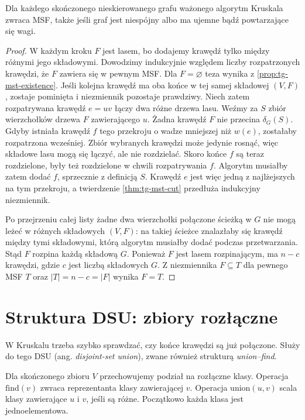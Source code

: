 \begin{twierdzenie}
\label{thm:tg-mst-kruskal}
Dla każdego skończonego nieskierowanego
grafu ważonego algorytm Kruskala zwraca MSF,
także jeśli graf jest niespójny albo
ma ujemne bądź powtarzające się wagi.
\end{twierdzenie}
\begin{proof}
W każdym kroku $F$ jest lasem, bo dodajemy
krawędź tylko między różnymi jego składowymi.
Dowodzimy indukcyjnie względem liczby rozpatrzonych
krawędzi, że $F$ zawiera się w pewnym MSF.
Dla $F=\varnothing$ teza wynika z
\ref{prop:tg-mst-existence}.
Jeśli kolejna krawędź ma oba końce w tej samej
składowej $(V,F)$, zostaje pominięta i niezmiennik
pozostaje prawdziwy. Niech zatem rozpatrywana
krawędź $e=uv$ łączy dwa różne drzewa lasu.
Weźmy za $S$ zbiór wierzchołków
drzewa $F$ zawierającego $u$.
Żadna krawędź $F$ nie przecina
$\delta_G(S)$. Gdyby istniała
krawędź $f$ tego przekroju
o wadze mniejszej niż $w(e)$,
zostałaby rozpatrzona wcześniej.
Zbiór wybranych krawędzi może jedynie rosnąć,
więc składowe lasu mogą się łączyć, ale nie rozdzielać.
Skoro końce $f$ są teraz rozdzielone, były też
rozdzielone w chwili rozpatrywania $f$.
Algorytm musiałby zatem dodać $f$,
sprzecznie z definicją $S$.
Krawędź $e$ jest więc
jedną z najlżejszych na tym
przekroju, a twierdzenie
\ref{thm:tg-mst-cut} przedłuża
indukcyjny niezmiennik.

Po przejrzeniu całej listy
żadne dwa wierzchołki połączone
ścieżką w $G$ nie mogą leżeć
w różnych składowych $(V,F)$:
na takiej ścieżce znalazłaby
się krawędź między tymi
składowymi, którą algorytm
musiałby dodać podczas
przetwarzania. Stąd $F$
rozpina każdą składową $G$.
Ponieważ $F$ jest lasem rozpinającym, ma $n-c$
krawędzi, gdzie $c$ jest liczbą składowych $G$.
Z niezmiennika $F\subseteq T$ dla pewnego MSF $T$
oraz $|T|=n-c=|F|$ wynika $F=T$.
\end{proof}

\section{Struktura DSU: zbiory rozłączne}
\label{sec:tg-mst-dsu}

W Kruskalu trzeba szybko sprawdzać,
czy końce krawędzi są już połączone.
Służy do tego DSU (ang. \emph{disjoint-set union}),
zwane również strukturą \emph{union--find}.

\begin{definicja}
\label{def:tg-mst-dsu}
Dla skończonego zbioru $V$ przechowujemy podział
na rozłączne klasy. Operacja
$\mathrm{find}(v)$ zwraca reprezentanta
klasy zawierającej $v$.
Operacja $\mathrm{union}(u,v)$
scala klasy zawierające $u$ i $v$,
jeśli są różne.
Początkowo każda klasa jest
jednoelementowa.
\end{definicja}

